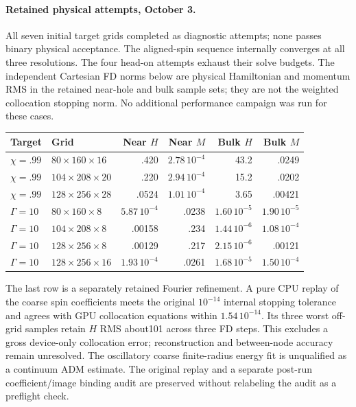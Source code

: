 \documentclass[11pt]{article}
\begin{document}
\paragraph{Retained physical attempts, October 3.}
All seven initial target grids completed as diagnostic attempts; none passes
binary physical acceptance. The aligned-spin sequence internally converges
at all three resolutions. The four head-on attempts exhaust their solve
budgets. The independent Cartesian FD norms below are physical Hamiltonian
and momentum RMS in the retained near-hole and bulk sample sets; they are
not the weighted collocation stopping norm. No additional performance
campaign was run for these cases.
\begin{center}\small
\begin{tabular}{llrrrr}\toprule
Target & Grid & Near $H$ & Near $M$ & Bulk $H$ & Bulk $M$\\\midrule
$\chi=.99$ & $80\times160\times16$ & .420 & $2.78\,10^{-4}$ & 43.2 & .0249\\
$\chi=.99$ & $104\times208\times20$ & .220 & $2.94\,10^{-4}$ & 15.2 & .0202\\
$\chi=.99$ & $128\times256\times28$ & .0524 & $1.01\,10^{-4}$ & 3.65 & .00421\\
$\Gamma=10$ & $80\times160\times8$ & $5.87\,10^{-4}$ & .0238 & $1.60\,10^{-5}$ & $1.90\,10^{-5}$\\
$\Gamma=10$ & $104\times208\times8$ & .00158 & .234 & $1.44\,10^{-6}$ & $1.08\,10^{-4}$\\
$\Gamma=10$ & $128\times256\times8$ & .00129 & .217 & $2.15\,10^{-6}$ & .00121\\
$\Gamma=10$ & $128\times256\times16$ & $1.93\,10^{-4}$ & .0261 & $1.68\,10^{-5}$ & $1.50\,10^{-4}$\\
\bottomrule\end{tabular}\end{center}
The last row is a separately retained Fourier refinement. A pure CPU replay
of the coarse spin coefficients meets the original $10^{-14}$ internal
stopping tolerance and agrees with GPU collocation equations within
$1.54\,10^{-14}$. Its three worst off-grid samples retain $H$ RMS about101
across three FD steps. This excludes a gross device-only collocation error;
reconstruction and between-node accuracy remain unresolved. The oscillatory
coarse finite-radius energy fit is unqualified as a continuum ADM estimate.
The original replay and a separate post-run coefficient/image binding audit
are preserved without relabeling the audit as a preflight check.
\end{document}
